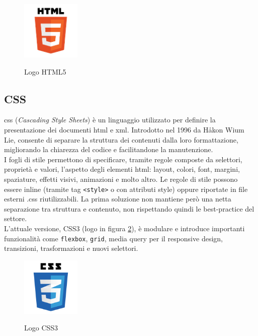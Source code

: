 \begin{figure}[H]
    \centering
    \includegraphics[width=0.25\textwidth, alt={Logo HTML5}]{img/html5.png}
    \caption[Logo HTML5]{Logo HTML5}\label{fig:logo_HTML5}
\end{figure}

\subsection{CSS}
\label{subsec:css}
\noindent \acrshort{css} (\textit{Cascading Style Sheets}) è un linguaggio utilizzato per definire la presentazione dei documenti \acrshort{html} e \acrshort{xml}. Introdotto nel 1996 da Håkon Wium Lie, consente di separare la struttura dei contenuti dalla loro formattazione, migliorando la chiarezza del codice e facilitandone la manutenzione.\\ 
I fogli di stile permettono di specificare, tramite regole composte da selettori, proprietà e valori, l’aspetto degli elementi \acrshort{html}: layout, colori, font, margini, spaziature, effetti visivi, animazioni e molto altro. Le regole di stile possono essere inline (tramite tag \texttt{<style>} o con attributi style) oppure riportate in file esterni .css riutilizzabili. La prima soluzione non mantiene però una netta separazione tra struttura e contenuto, non rispettando quindi le best-practice del settore.\\ 
L'attuale versione, CSS3 (logo in figura \ref{fig:logo_CSS3}), è modulare e introduce importanti funzionalità come \texttt{flexbox}, \texttt{grid}, media query per il responsive design, transizioni, trasformazioni e nuovi selettori.
\begin{figure}[H]
    \centering
    \includegraphics[width=0.25\textwidth, alt={Logo CSS3}]{img/css3.png}
    \caption[Logo CSS3]{Logo CSS3}\label{fig:logo_CSS3}
\end{figure}

